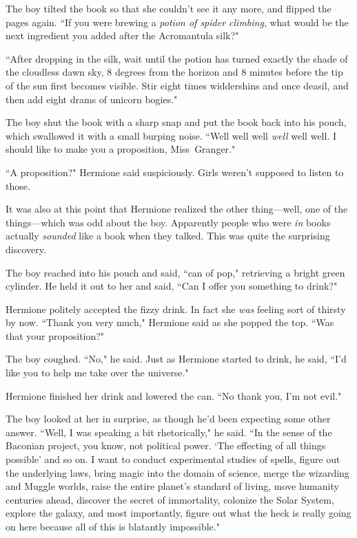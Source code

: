 The boy tilted the book so that she couldn't see it any more, and flipped the pages again. ``If you were brewing a \emph{potion of spider climbing}, what would be the next ingredient you added after the Acromantula silk?"

``After dropping in the silk, wait until the potion has turned exactly the shade of the cloudless dawn sky, 8 degrees from the horizon and 8 minutes before the tip of the sun first becomes visible. Stir eight times widdershins and once deasil, and then add eight drams of unicorn bogies."

The boy shut the book with a sharp snap and put the book back into his pouch, which swallowed it with a small burping noise. ``Well well well \emph{well} well well. I should like to make you a proposition, Miss~Granger."

``A proposition?" Hermione said suspiciously. Girls weren't supposed to listen to those.

It was also at this point that Hermione realized the other thing—well, one of the things—which was odd about the boy. Apparently people who were \emph{in} books actually \emph{sounded} like a book when they talked. This was quite the surprising discovery.

The boy reached into his pouch and said, ``can of pop," retrieving a bright green cylinder. He held it out to her and said, ``Can I offer you something to drink?"

Hermione politely accepted the fizzy drink. In fact she \emph{was} feeling sort of thirsty by now. ``Thank you very much," Hermione said as she popped the top. ``Was that your proposition?"

The boy coughed. ``No," he said. Just as Hermione started to drink, he said, ``I'd like you to help me take over the universe."

Hermione finished her drink and lowered the can. ``No thank you, I'm not evil."

The boy looked at her in surprise, as though he'd been expecting some other answer. ``Well, I was speaking a bit rhetorically," he said. ``In the sense of the Baconian project, you know, not political power. `The effecting of all things possible' and so on. I want to conduct experimental studies of spells, figure out the underlying laws, bring magic into the domain of science, merge the wizarding and Muggle worlds, raise the entire planet's standard of living, move humanity centuries ahead, discover the secret of immortality, colonize the Solar System, explore the galaxy, and most importantly, figure out what the heck is really going on here because all of this is blatantly impossible."

